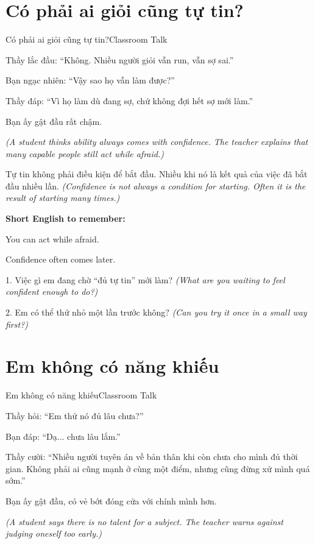 \section{Có phải ai giỏi cũng tự tin?}
\begin{truyen}{Có phải ai giỏi cũng tự tin?}{Classroom Talk}

Thầy lắc đầu: ``Không. Nhiều người giỏi vẫn run, vẫn sợ sai.''

Bạn ngạc nhiên: ``Vậy sao họ vẫn làm được?''

Thầy đáp: ``Vì họ làm dù đang sợ, chứ không đợi hết sợ mới làm.''

Bạn ấy gật đầu rất chậm.

\textit{(A student thinks ability always comes with confidence. The teacher explains that many capable people still act while afraid.)}
\end{truyen}

\begin{baihoc}
Tự tin không phải điều kiện để bắt đầu. Nhiều khi nó là kết quả của việc đã bắt đầu nhiều lần.
\textit{(Confidence is not always a condition for starting. Often it is the result of starting many times.)}
\end{baihoc}

\begin{ghinhoanh}
\textbf{Short English to remember:}

You can act while afraid.

Confidence often comes later.
\end{ghinhoanh}

\begin{tuhocnhanh}
1. Việc gì em đang chờ ``đủ tự tin'' mới làm? \textit{(What are you waiting to feel confident enough to do?)}

2. Em có thể thử nhỏ một lần trước không? \textit{(Can you try it once in a small way first?)}
\end{tuhocnhanh}
\ngancach

\section{Em không có năng khiếu}
\begin{truyen}{Em không có năng khiếu}{Classroom Talk}

Thầy hỏi: ``Em thử nó đủ lâu chưa?''

Bạn đáp: ``Dạ... chưa lâu lắm.''

Thầy cười: ``Nhiều người tuyên án về bản thân khi còn chưa cho mình đủ thời gian. Không phải ai cũng mạnh ở cùng một điểm, nhưng cũng đừng xử mình quá sớm.''

Bạn ấy gật đầu, có vẻ bớt đóng cửa với chính mình hơn.

\textit{(A student says there is no talent for a subject. The teacher warns against judging oneself too early.)}
\end{truyen}


